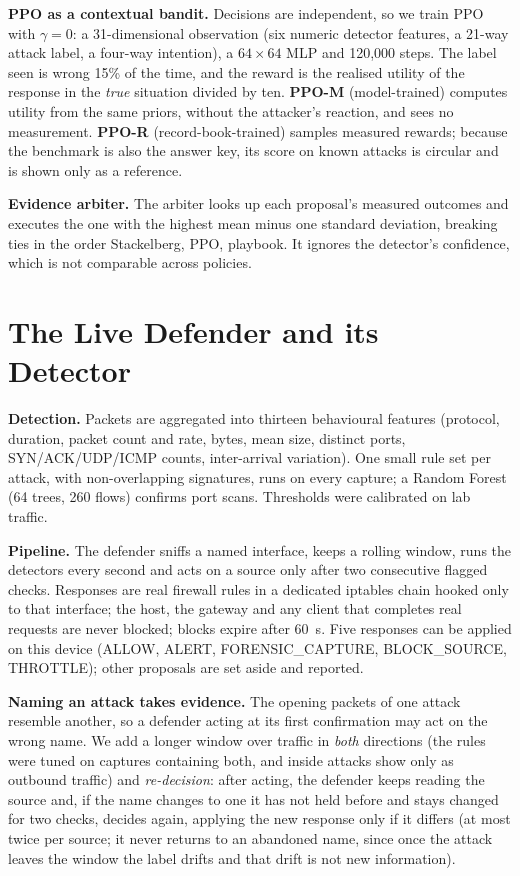 \documentclass[conference]{IEEEtran}
\begin{document}
\textbf{PPO as a contextual bandit.} Decisions are independent, so we train PPO \cite{schulman2017ppo,raffin2021sb3} with $\gamma=0$: a 31-dimensional observation (six numeric detector features, a 21-way attack label, a four-way intention), a $64\times64$ MLP and 120{,}000 steps. The label seen is wrong 15\% of the time, and the reward is the realised utility of the response in the \emph{true} situation divided by ten. \textbf{PPO-M} (model-trained) computes utility from the same priors, without the attacker's reaction, and sees no measurement. \textbf{PPO-R} (record-book-trained) samples measured rewards; because the benchmark is also the answer key, its score on known attacks is circular and is shown only as a reference.

\textbf{Evidence arbiter.} The arbiter looks up each proposal's measured outcomes and executes the one with the highest mean minus one standard deviation, breaking ties in the order Stackelberg, PPO, playbook. It ignores the detector's confidence, which is not comparable across policies.

\section{The Live Defender and its Detector}
\label{sec:live}
\textbf{Detection.} Packets are aggregated into thirteen behavioural features (protocol, duration, packet count and rate, bytes, mean size, distinct ports, SYN/ACK/UDP/ICMP counts, inter-arrival variation). One small rule set per attack, with non-overlapping signatures, runs on every capture; a Random Forest \cite{breiman2001random} (64 trees, 260 flows) confirms port scans. Thresholds were calibrated on lab traffic.

\textbf{Pipeline.} The defender sniffs a named interface, keeps a rolling window, runs the detectors every second and acts on a source only after two consecutive flagged checks. Responses are real firewall rules in a dedicated iptables chain hooked only to that interface; the host, the gateway and any client that completes real requests are never blocked; blocks expire after 60~s. Five responses can be applied on this device (ALLOW, ALERT, FORENSIC\_CAPTURE, BLOCK\_SOURCE, THROTTLE); other proposals are set aside and reported.

\textbf{Naming an attack takes evidence.} The opening packets of one attack resemble another, so a defender acting at its first confirmation may act on the wrong name. We add a longer window over traffic in \emph{both} directions (the rules were tuned on captures containing both, and inside attacks show only as outbound traffic) and \emph{re-decision}: after acting, the defender keeps reading the source and, if the name changes to one it has not held before and stays changed for two checks, decides again, applying the new response only if it differs (at most twice per source; it never returns to an abandoned name, since once the attack leaves the window the label drifts and that drift is not new information).
\end{document}
